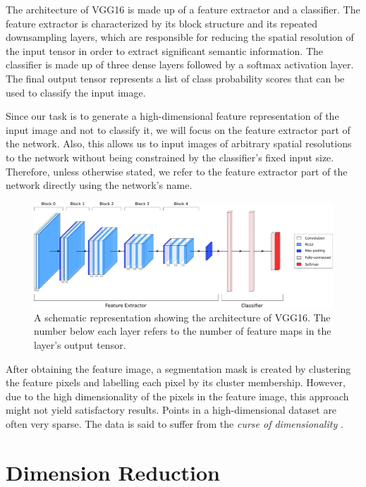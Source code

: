 The architecture of VGG16 is made up of a feature extractor and a classifier. The feature extractor is characterized by its block structure and its repeated downsampling layers, which are responsible for reducing the spatial resolution of the input tensor in order to extract significant semantic information. The classifier is made up of three dense layers followed by a softmax activation layer. The final output tensor represents a list of class probability scores that can be used to classify the input image.

Since our task is to generate a high-dimensional feature representation of the input image and not to classify it, we will focus on the feature extractor part of the network. Also, this allows us to input images of arbitrary spatial resolutions to the network without being constrained by the classifier's fixed input size. Therefore, unless otherwise stated, we refer to the feature extractor part of the network directly using the network's name.

\begin{figure}[t]
    \centering
    \includegraphics[width=\textwidth]{figures/vgg16.pdf}
    \caption[Caption for LOF]{A schematic representation showing the architecture of VGG16\footnotemark. The number below each layer refers to the number of feature maps in the layer's output tensor.}
    \label{fig:vgg16}
\end{figure}

After obtaining the feature image, a segmentation mask is created by clustering the feature pixels and labelling each pixel by its cluster membership. However, due to the high dimensionality of the pixels in the feature image, this approach might not yield satisfactory results. Points in a high-dimensional dataset are often very sparse. The data is said to suffer from the \emph{curse of dimensionality} \parencite{bishop2006pattern}.

\section{Dimension Reduction}

